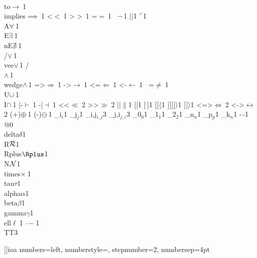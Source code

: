 {        {\\to}{{$\to\ $}}1
        {\\implies}{{$\implies\ $}}1
{<}{{$<\ $}}1
        {>}{{$>\ $}}1
        {=}{{$=\ $}}1
        {~}{{$\neg\ $}}1
        {|}{{$\mid$}}1
        {'}{{$^\prime$}}1
{\\A}{{$\forall\ $}}1
        {\\E}{{$\exists\ $}}1
        {\\nE}{{$\nexists\ $}}1
        {\\/}{{$\vee\,$}}1
        {\\vee}{{$\vee\,$}}1
        {/\\}{{$\wedge\,$}}1
        {\\wedge}{{$\wedge\,$}}1
        {=>}{{$\Rightarrow\ $}}1
        {->}{{$\rightarrow\ $}}1
        {<=}{{$\Leftarrow\ $}}1
        {<-}{{$\leftarrow\ $}}1
{~=}{{$\neq\ $}}1
        {\\U}{{$\cup\ $}}1
        {\\I}{{$\cap\ $}}1
        {|-}{{$\vdash\ $}}1
        {-|}{{$\dashv\ $}}1
        {<<}{{$\ll\ $}}2
        {>>}{{$\gg\ $}}2
        {||}{{$\|$}}1
{[}{{$[$}}1
        {]}{{$\,]$}}1
        {[[}{{$\langle$}}1
        {]]]}{{$]\rangle$}}1
        {]]}{{$\rangle$}}1
        {<=>}{{$\Leftrightarrow\ $}}2
        {<->}{{$\leftrightarrow\ $}}2
        {(+)}{{$\oplus\ $}}1
        {(-)}{{$\ominus\ $}}1
        {_i}{{$_{i}$}}1
        {_j}{{$_{j}$}}1
        {_{i,j}}{{$_{i,j}$}}3
        {_{j,i}}{{$_{j,i}$}}3
        {_0}{{$_0$}}1
        {_1}{{$_1$}}1
        {_2}{{$_2$}}1
        {_n}{{$_n$}}1
        {_p}{{$_p$}}1
        {_k}{{$_n$}}1
        {-}{{$\ms{-}$}}1
        {@}{{}}0
        {\\delta}{{$\delta$}}1
        {\\R}{{${\mathcal R}$}}1
        {\\Rplus}{{$\Rplus$}}1
        {\\N}{{${\mathcal N}$}}1
        {\\times}{{$\times\ $}}1
        {\\tau}{{$\tau$}}1
        {\\alpha}{{$\alpha$}}1
        {\\beta}{{$\beta$}}1
        {\\gamma}{{$\gamma$}}1
        {\\ell}{{$\ell\ $}}1
        {--}{{$-\ $}}1
        {\\TT}{{\hspace{1.5em}}}3
      }

[]{ioa}
{
  numbers=left,
  numberstyle=\tiny,
  stepnumber=2,
  numbersep=4pt
}

